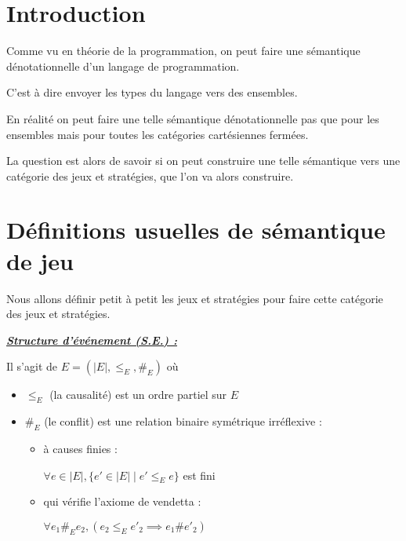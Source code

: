 \documentclass[a4paper,12ptCOUCOU
]{article}
\title{\letitle}
\author{\leauthor}
\date{}
\newlength{\mydepth}
\newlength{\myheight}
\newenvironment{answer}
{\par\begin{lrbox}{\mybox}\quad\begin{minipage}{\linewidth}\color{black}\setlength{\parskip}{10pt plus 1pt minus 1pt}\vspace*{-.7\baselineskip}}
{\end{minipage}\end{lrbox}
\settodepth{\mydepth}{\usebox{\mybox}}
\settoheight{\myheight}{\usebox{\mybox}}
\addtolength{\myheight}{\mydepth}
\noindent\makebox[0pt]{
  \color{gray}\hspace{-0pt}\rule[-\mydepth]{1pt}{\myheight}}
\usebox{\mybox}
  }
\begin{document}
\maketitle

\newpage

\section{Introduction}

Comme vu en théorie de la programmation, on peut faire une sémantique
dénotationnelle d'un langage de programmation.

C'est à dire envoyer les types du langage vers des ensembles.

En réalité on peut faire une telle sémantique dénotationnelle pas que pour les
ensembles mais pour toutes les catégories cartésiennes fermées.

La question est alors de savoir si on peut construire une telle sémantique vers
une catégorie des jeux et stratégies, que l'on va alors construire.

\newpage
\section{Définitions usuelles de sémantique de jeu}

Nous allons définir petit à petit les jeux et stratégies pour faire
cette catégorie des jeux et stratégies.

\vspace{0.4cm}\begin{minipage}{\linewidth}\textbf{\textit{\underline{ Structure d'événement (S.E.) : }}} \begin{answer}

Il s'agit de $E = (|E|, \leq_E, \#_E)$ où
\begin{itemize}
\item $\leq_E$ (la causalité) est un ordre partiel sur $E$
\item $\#_E$ (le conflit) est une relation binaire symétrique irréflexive :
\begin{itemize}
\item à causes finies :

$\forall e \in |E|, \{e' \in |E| \mid e' \leq_E e\}$ est fini

\item qui vérifie l'axiome de vendetta :

$\forall e_1 \#_E e_2, (e_2 \leq_E e'_2 \implies e_1 \# e'_2)$
\end{itemize}
\end{itemize}
\end{answer}\end{minipage}
\end{document}
